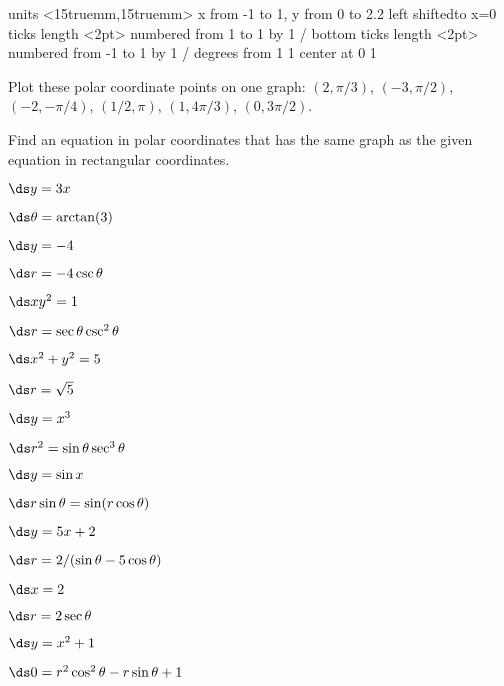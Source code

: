 \figure
\vbox{\beginpicture
\normalgraphs
\ninepoint
\setcoordinatesystem units <15truemm,15truemm>
\setplotarea x from -1 to 1, y from 0 to 2.2
\axis left shiftedto x=0 ticks length <2pt> numbered from 1 to 1 by 1 /
\axis bottom ticks length <2pt> numbered from -1 to 1 by 1 /
 degrees from 1 1 center at 0 1
\endpicture}

\begin{exercises}

\exercise Plot these polar coordinate points on one graph:
$(2,\pi/3)$, $(-3,\pi/2)$, $(-2,-\pi/4)$, $(1/2,\pi)$, $(1,4\pi/3)$, 
$(0,3\pi/2)$.

\noindent Find an equation in polar coordinates that has the same
graph as the given equation in rectangular coordinates.

\twocol

\exercise $\ds y=3x$
\begin{answer} $\ds \theta=\arctan(3)$
\end{answer}

\exercise $\ds y=-4$
\begin{answer} $\ds r=-4\csc\theta$
\end{answer}

\exercise $\ds xy^2=1$
\begin{answer} $\ds r=\sec\theta\csc^2\theta$
\end{answer}

\exercise $\ds x^2+y^2=5$
\begin{answer} $\ds r=\sqrt{5}$
\end{answer}

\exercise $\ds y=x^3$
\begin{answer} $\ds r^2=\sin\theta\sec^3\theta$
\end{answer}

\exercise $\ds y=\sin x$
\begin{answer} $\ds r\sin\theta=\sin(r\cos\theta)$
\end{answer}

\exercise $\ds y=5x+2$
\begin{answer} $\ds r=2/(\sin\theta-5\cos\theta)$
\end{answer}

\exercise $\ds x=2$
\begin{answer} $\ds r=2\sec\theta$
\end{answer}

\exercise $\ds y=x^2+1$
\begin{answer} $\ds 0=r^2\cos^2\theta-r\sin\theta+1$
\end{answer}


\end{exercises}
